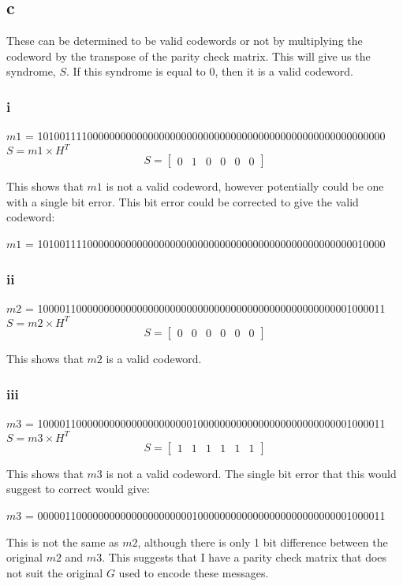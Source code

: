 \subsection{c}
These can be determined to be valid codewords or not by multiplying the codeword by the transpose of the parity check matrix.
This will give us the syndrome, $S$.
If this syndrome is equal to 0, then it is a valid codeword.

\subsubsection{i}
$m1$ = 101001111000000000000000000000000000000000000000000000000000000	\\

$S = m1 \times H^{T}$ \\
\[ S = \left[ \begin{array}{cccccc} 0 & 1 & 0 & 0 & 0 & 0 \end{array} \right] \]

This shows that $m1$ is not a valid codeword, however potentially could be one with a single bit error.
This bit error could be corrected to give the valid codeword:

\noindent $m1$ = 101001111000000000000000000000000000000000000000000000000010000

\subsubsection{ii}
$m2$ = 100001100000000000000000000000000000000000000000000000001000011	\\

$S = m2 \times H^{T}$ \\
\[ S = \left[ \begin{array}{cccccc} 0 & 0 & 0 & 0 & 0 & 0 \end{array} \right] \]

This shows that $m2$ is a valid codeword.

\subsubsection{iii}
$m3$ = 100001100000000000000000000010000000000000000000000000001000011	\\

$S = m3 \times H^{T}$ \\
\[ S = \left[ \begin{array}{cccccc} 1 & 1 & 1 & 1 & 1 & 1 \end{array} \right] \]

This shows that $m3$ is not a valid codeword.
The single bit error that this would suggest to correct would give:

$m3$ = 000001100000000000000000000010000000000000000000000000001000011

This is not the same as $m2$, although there is only 1 bit difference between the original $m2$ and $m3$.
This suggests that I have a parity check matrix that does not suit the original $G$ used to encode these messages.
